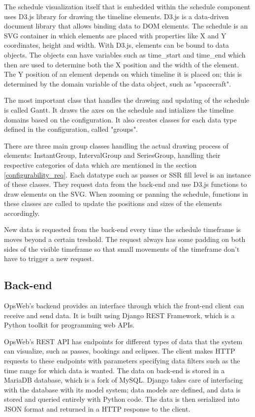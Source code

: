 The schedule visualization itself that is embedded within the schedule component uses D3.js library for drawing the timeline elements. D3.js is a data-driven document library that allows binding data to DOM elements. The schedule is an SVG container in which elements are placed with properties like X and Y coordinates, height and width. With D3.js, elements can be bound to data objects. The objects can have variables such as time\_start and time\_end which then are used to determine both the X position and the width of the element. The Y position of an element depends on which timeline it is placed on; this is determined by the domain variable of the data object, such as "spacecraft".

The most important class that handles the drawing and updating of the schedule is called Gantt. It draws the axes on the schedule and intializes the timeline domains based on the configuration. It also creates classes for each data type defined in the configuration, called "groups".

There are three main group classes handling the actual drawing process of elements: InstantGroup, IntervalGroup and SeriesGroup, handling their respective categories of data which are mentioned in the section \ref{configurability_req}. Each datatype such as passes or SSR fill level is an instance of these classes. They request data from the back-end and use D3.js functions to draw elements on the SVG. When zooming or panning the schedule, functions in these classes are called to update the positions and sizes of the elements accordingly.

New data is requested from the back-end every time the schedule timeframe is moves beyond a certain treshold. The request always has some padding on both sides of the visible timeframe so that small movements of the timeframe don't have to trigger a new request.

\cite{d3js}
\subsection{Back-end}
OpsWeb's backend provides an interface through which the front-end client can receive and send data. It is built using Django REST Framework, which is a Python toolkit for programming web APIs. \cite{django} 

OpsWeb's REST API has endpoints for different types of data that the system can visualize, such as passes, bookings and eclipses. The client makes HTTP requests to these endpoints with parameters specifying data filters such as the time range for which data is wanted. The data on back-end is stored in a MariaDB database, which is a fork of MySQL. \cite{mariadb} Django takes care of interfacing with the database with its model system; data models are defined, and data is stored and queried entirely with Python code. The data is then serialized into JSON format and returned in a HTTP response to the client.

